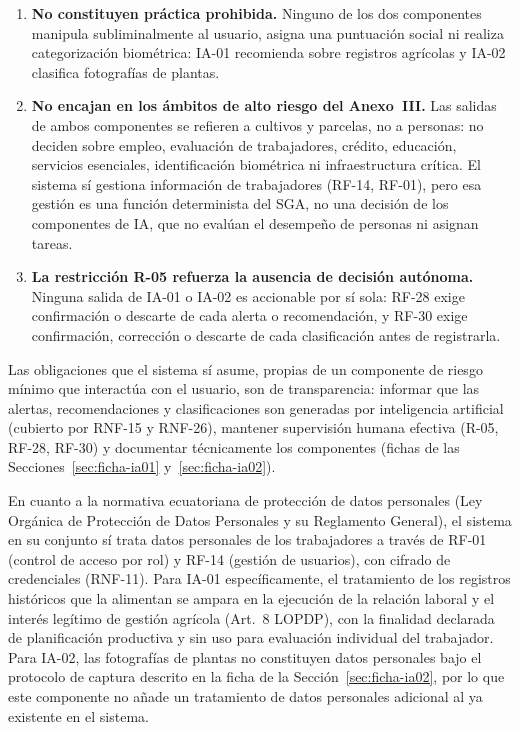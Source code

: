 \documentclass[12pt,a4paper]{article}
\begin{document}
\begin{enumerate}
\item \textbf{No constituyen práctica prohibida.} Ninguno de los dos componentes manipula subliminalmente al usuario, asigna una puntuación social ni realiza categorización biométrica: IA-01 recomienda sobre registros agrícolas y IA-02 clasifica fotografías de plantas.
\item \textbf{No encajan en los ámbitos de alto riesgo del Anexo~III.} Las salidas de ambos componentes se refieren a cultivos y parcelas, no a personas: no deciden sobre empleo, evaluación de trabajadores, crédito, educación, servicios esenciales, identificación biométrica ni infraestructura crítica. El sistema sí gestiona información de trabajadores (RF-14, RF-01), pero esa gestión es una función determinista del SGA, no una decisión de los componentes de IA, que no evalúan el desempeño de personas ni asignan tareas.
\item \textbf{La restricción R-05 refuerza la ausencia de decisión autónoma.} Ninguna salida de IA-01 o IA-02 es accionable por sí sola: RF-28 exige confirmación o descarte de cada alerta o recomendación, y RF-30 exige confirmación, corrección o descarte de cada clasificación antes de registrarla.
\end{enumerate}

Las obligaciones que el sistema sí asume, propias de un componente de riesgo mínimo que interactúa con el usuario, son de transparencia: informar que las alertas, recomendaciones y clasificaciones son generadas por inteligencia artificial (cubierto por RNF-15 y RNF-26), mantener supervisión humana efectiva (R-05, RF-28, RF-30) y documentar técnicamente los componentes (fichas de las Secciones~\ref{sec:ficha-ia01} y~\ref{sec:ficha-ia02}).

En cuanto a la normativa ecuatoriana de protección de datos personales (Ley Orgánica de Protección de Datos Personales y su Reglamento General), el sistema en su conjunto sí trata datos personales de los trabajadores a través de RF-01 (control de acceso por rol) y RF-14 (gestión de usuarios), con cifrado de credenciales (RNF-11). Para IA-01 específicamente, el tratamiento de los registros históricos que la alimentan se ampara en la ejecución de la relación laboral y el interés legítimo de gestión agrícola (Art.~8 LOPDP), con la finalidad declarada de planificación productiva y sin uso para evaluación individual del trabajador. Para IA-02, las fotografías de plantas no constituyen datos personales bajo el protocolo de captura descrito en la ficha de la Sección~\ref{sec:ficha-ia02}, por lo que este componente no añade un tratamiento de datos personales adicional al ya existente en el sistema.
\end{document}
